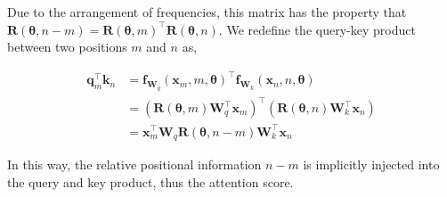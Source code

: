 \documentclass{article}
\begin{document}
 


Due to the arrangement of frequencies, this matrix has the property that $\mathbf{R}(\bm{\theta},n - m) = \mathbf{R}(\bm{\theta},m)^\top\mathbf{R}(\bm{\theta},n)$. We redefine the query-key product between two positions $m$ and $n$ as, 

\begin{align}
\mathbf{q}^\top_m{\mathbf{k}_n}&=\mathbf{f}_{\mathbf{W}_q}(\mathbf{x}_m, m, \bm{\theta})^\top\mathbf{f}_{\mathbf{W}_k}(\mathbf{x}_n, n, \bm{\theta}) \\ 
& = \left(\mathbf{R}({\bm{\theta},m})\mathbf{W}^\top_q\mathbf{x}_m \right)^\top \left( \mathbf{R}(\bm{\theta},n)\mathbf{W}^\top_k\mathbf{x}_n \right) \\
&= \mathbf{x}_m^\top\mathbf{W}_q \mathbf{R}(\bm{\theta},n - m) \mathbf{W}_k^\top\mathbf{x}_n 
\end{align}

In this way, the relative positional information $n-m$
is implicitly injected into the query and key product, thus the attention score.
\end{document}

